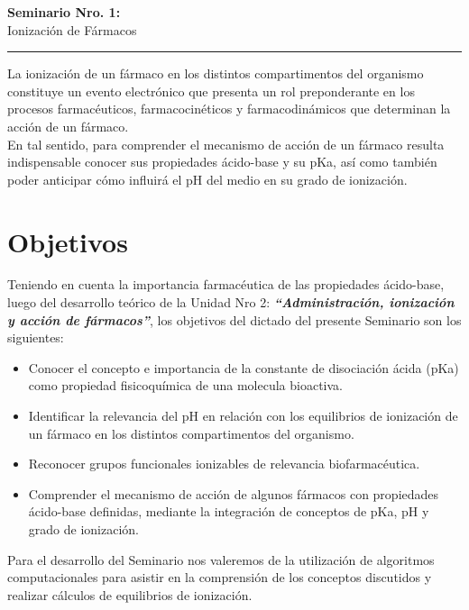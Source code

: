 \documentclass[12pt,a4paper]{article}
\begin{document}
	
\begin{center}
	\Large
	\textbf{Seminario Nro. 1:}\\
	Ionización de Fármacos
\end{center}

\begin{center}
	\noindent\rule{14cm}{2pt}
\end{center}

La ionización de un fármaco en los distintos compartimentos del organismo constituye un evento electrónico que presenta un rol preponderante en los procesos farmacéuticos, farmacocinéticos y farmacodinámicos que determinan la acción de un fármaco.\\

En tal sentido, para comprender el mecanismo de acción de un fármaco resulta indispensable conocer sus propiedades ácido-base y su pKa, así como también poder anticipar cómo influirá el pH del medio en su grado de ionización.


\section*{Objetivos}
Teniendo en cuenta la importancia farmacéutica de las propiedades ácido-base, luego del desarrollo teórico de la Unidad Nro 2: \textit{\textbf{“Administración, ionización y acción de fármacos”}}, los objetivos del dictado del presente Seminario son los siguientes:

\begin{itemize}
	\item Conocer el concepto e importancia de la constante de disociación ácida (pKa) como propiedad fisicoquímica de una molecula bioactiva.
	
	\item Identificar la relevancia del pH en relación con los equilibrios de ionización de un fármaco en los distintos compartimentos del organismo.
	
	\item Reconocer grupos funcionales ionizables de relevancia biofarmacéutica.
	
	\item Comprender el mecanismo de acción de algunos fármacos con propiedades ácido-base definidas, mediante la integración de conceptos de pKa, pH y grado de ionización.
	
\end{itemize}

Para el desarrollo del Seminario nos valeremos de la utilización de algoritmos computacionales para asistir en la comprensión de los conceptos discutidos y realizar cálculos de equilibrios de ionización.
\end{document}
